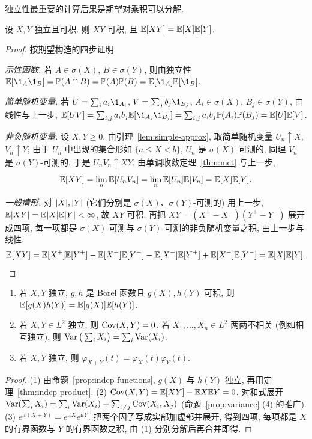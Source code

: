 独立性最重要的计算后果是期望对乘积可以分解.

\begin{theorem}[独立随机变量乘积的期望]\label{thm:indep-product}
设 $X,Y$ 独立且可积. 则 $XY$ 可积, 且 $\mathbb{E}[XY]=\mathbb{E}[X]\mathbb{E}[Y]$.
\end{theorem}

\begin{proof}
按期望构造的四步证明.

\emph{示性函数.} 若 $A\in\sigma(X)$, $B\in\sigma(Y)$, 则由独立性 $\E[\1_A\1_B]=\P(A\cap B)=\P(A)\P(B)=\E[\1_A]\E[\1_B]$.

\emph{简单随机变量.} 若 $U=\sum_i a_i\1_{A_i}$, $V=\sum_j b_j\1_{B_j}$, $A_i\in\sigma(X)$, $B_j\in\sigma(Y)$, 由线性与上一步,
$\E[UV]=\sum_{i,j}a_ib_j\E[\1_{A_i}\1_{B_j}]=\sum_{i,j}a_ib_j\P(A_i)\P(B_j)=\E[U]\E[V]$.

\emph{非负随机变量.} 设 $X,Y\ge0$. 由引理~\ref{lem:simple-approx}, 取简单随机变量 $U_n\uparrow X$, $V_n\uparrow Y$; 由于 $U_n$ 中出现的集合形如 $\{a\le X<b\}$, $U_n$ 是 $\sigma(X)$-可测的, 同理 $V_n$ 是 $\sigma(Y)$-可测的. 于是 $U_nV_n\uparrow XY$, 由单调收敛定理~\ref{thm:mct} 与上一步,
\[
\mathbb{E}[XY]=\lim_n\mathbb{E}[U_nV_n]=\lim_n\mathbb{E}[U_n]\mathbb{E}[V_n]=\mathbb{E}[X]\mathbb{E}[Y].
\]

\emph{一般情形.} 对 $\lvert X\rvert,\lvert Y\rvert$ (它们分别是 $\sigma(X)$、$\sigma(Y)$-可测的) 用上一步, $\mathbb{E}\lvert XY\rvert=\mathbb{E}\lvert X\rvert\mathbb{E}\lvert Y\rvert<\infty$, 故 $XY$ 可积. 再把 $XY=(X^+-X^-)(Y^+-Y^-)$ 展开成四项, 每一项都是 $\sigma(X)$-可测与 $\sigma(Y)$-可测的非负随机变量之积, 由上一步与线性,
\[
\mathbb{E}[XY]=\mathbb{E}[X^+]\mathbb{E}[Y^+]-\mathbb{E}[X^+]\mathbb{E}[Y^-]-\mathbb{E}[X^-]\mathbb{E}[Y^+]+\mathbb{E}[X^-]\mathbb{E}[Y^-]=\mathbb{E}[X]\mathbb{E}[Y].\qedhere
\]
\end{proof}

\begin{corollary}\label{cor:indep-consequences}
\begin{enumerate}
\item 若 $X,Y$ 独立, $g,h$ 是 Borel 函数且 $g(X),h(Y)$ 可积, 则 $\mathbb{E}[g(X)h(Y)]=\mathbb{E}[g(X)]\mathbb{E}[h(Y)]$.
\item 若 $X,Y\in L^2$ 独立, 则 $\operatorname{Cov}(X,Y)=0$. 若 $X_1,\dots,X_n\in L^2$ 两两不相关 (例如相互独立), 则 $\operatorname{Var}\big(\sum_iX_i\big)=\sum_i\operatorname{Var}(X_i)$.
\item 若 $X,Y$ 独立, 则 $\varphi_{X+Y}(t)=\varphi_X(t)\varphi_Y(t)$.
\end{enumerate}
\end{corollary}

\begin{proof}
(1) 由命题~\ref{prop:indep-functions}, $g(X)$ 与 $h(Y)$ 独立, 再用定理~\ref{thm:indep-product}.
(2) $\operatorname{Cov}(X,Y)=\mathbb{E}[XY]-\mathbb{E} X\mathbb{E} Y=0$. 对和式展开 $\operatorname{Var}(\sum_iX_i)=\sum_i\operatorname{Var}(X_i)+\sum_{i\ne j}\operatorname{Cov}(X_i,X_j)$ (命题~\ref{prop:variance} (4) 的推广).
(3) $e^{\mathrm{i}t(X+Y)}=e^{\mathrm{i}tX}e^{\mathrm{i}tY}$. 把两个因子写成实部加虚部并展开, 得到四项, 每项都是 $X$ 的有界函数与 $Y$ 的有界函数之积, 由 (1) 分别分解后再合并即得.
\end{proof}

